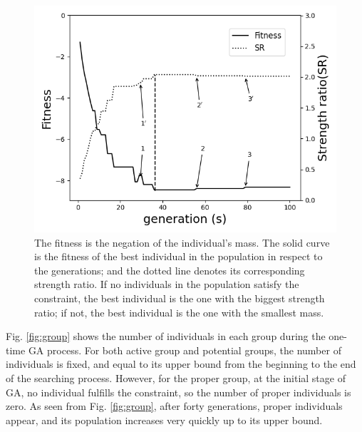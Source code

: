 \begin{figure}[!tb]
	\centering
	\includegraphics[width=\linewidth]{Figures/chapter3/part1/fig/fitness_strength_ratio.png}
	\caption{The fitness is the negation of the individual's mass. The solid
		curve is the fitness of the best individual in the population in respect
		to the generations; and the dotted line denotes its corresponding strength
		ratio. If no individuals in the population satisfy the constraint, the
		best individual is the one with the biggest strength ratio; if not, the
		best individual is the one with the smallest mass.
}
	\label{fig:sr}
\end{figure}



Fig. \ref{fig:group} shows the number of individuals in each group during the
one-time GA process.  For both active group and potential groups, the number of
individuals is fixed, and equal to its upper bound from the beginning to the
end of the searching process. However, for the proper group, at the initial
stage of GA, no individual fulfills the constraint, so the number of proper
individuals is zero. As seen from Fig. \ref{fig:group}, after forty
generations, proper individuals appear, and its population increases very
quickly up to its upper bound.

